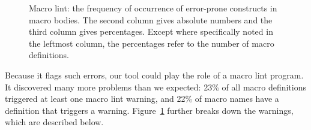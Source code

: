 \documentclass[10pt]{article}
\newcommand{\captionsmall}[1]{\caption[]{\small #1}}
\begin{document}
\begin{figure}
  {\small\centerline{}}
  
  \captionsmall{Macro lint:  the frequency of occurrence of error-prone
    constructs in macro bodies.  The second column gives absolute numbers
    and the third column gives percentages.  Except where specifically
    noted in the leftmost column, the percentages refer to the number of macro definitions.}
  \label{fig:macro-lint}
\end{figure}


Because it flags such errors, our tool could play the role of a macro lint
program.  It discovered many more problems than we expected: 23\% of all
macro definitions triggered at least one macro lint warning, and 22\% of
macro names have a definition that triggers a warning.
Figure~\ref{fig:macro-lint} further breaks down the warnings, which are
described below.
\end{document}
